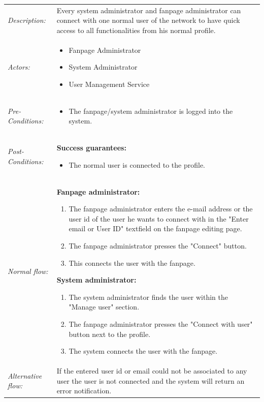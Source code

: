\documentclass[11pt,a4paper]{report}
\begin{document}
\begin{longtable}{p{} | p{}}
        \hline
        \emph{Description:} & Every system administrator and fanpage administrator can connect with one normal user of the network to have quick access to all functionalities from his normal profile.\\
        \emph{Actors:} & 
            \begin{itemize}
                \item Fanpage Administrator
                \item System Administrator
                \item User Management Service
             \end{itemize} \\
        \emph{Pre-Conditions:} & 
            \begin{itemize} 
                \item The fanpage/system administrator is logged into the system.
             \end{itemize} \\
        \emph{Post-Conditions:} & \textbf{Success guarantees:} 
            \begin{itemize} 
                \item The normal user is connected to the profile.
            \end{itemize} \\
        \emph{Normal flow:} & 
            \textbf{Fanpage administrator:}
            \begin{enumerate} 
                \item The fanpage administrator enters the e-mail address or the user id of the user he wants to connect with in the "Enter email or User ID" textfield on the fanpage editing page.
                \item The fanpage administrator presses the "Connect" button.
                \item This connects the user with the fanpage. 
             \end{enumerate}
             \textbf{System administrator:}
            \begin{enumerate} 
                \item The system administrator finds the user within the "Manage user" section.
                \item The fanpage administrator presses the "Connect with user" button next to the profile.
                \item The system connects the user with the fanpage. 
             \end{enumerate} \\
        \emph{Alternative flow:} & If the entered user id or email could not be associated to any user the user is not connected and the system will return an error notification.\\ 
             \hline
\end{longtable}
\end{document}
